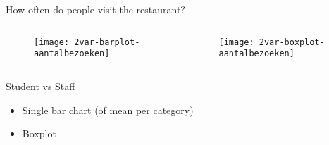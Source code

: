 \documentclass[aspectratio=169]{beamer}
\begin{document}
\begin{frame}{How often do people visit the restaurant?}
  
  \begin{columns}
    
    \begin{column}{0.5\textwidth}
      \begin{figure}
        \centering
        \texttt{[image: 2var-barplot-aantalbezoeken]}
        \label{fig:studentenbar}
      \end{figure}
    \end{column}
    
    \begin{column}{0.5\textwidth}
      \begin{figure}
        \centering
        \texttt{[image: 2var-boxplot-aantalbezoeken]}
        \label{fig:boxplotStudenten2}
      \end{figure}
    \end{column}
    
  \end{columns}
\end{frame}

\begin{frame}{Student vs Staff}
  
  \begin{itemize}
    \item \alert<1>{Single bar chart} (of mean per category)
    \item \alert<2>{Boxplot}
  \end{itemize}
  
  \begin{figure}
    \centering
  \end{figure}
  
\end{frame}
\end{document}
